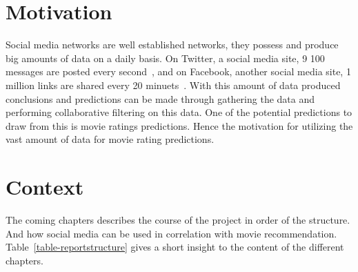 \section{Motivation}
Social media networks are well established networks, they possess and produce big amounts of data on a daily basis. On Twitter, a social media site, 9 100 messages are posted every second~\cite{twitt-stats}, and on Facebook, another social media site, 1 million links are shared every 20 minuets~\cite{face-stats}. With this amount of data produced conclusions and predictions can be made through gathering the data and performing collaborative filtering on this data. One of the potential predictions to draw from this is movie ratings predictions. Hence the motivation for utilizing the vast amount of data for movie rating predictions.


\section{Context}
The coming chapters describes the course of the project in order of the structure. And how social media can be used in correlation with movie recommendation. Table~\ref{table-reportstructure} gives a short insight to the content of the different chapters.

